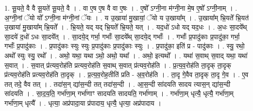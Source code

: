 \documentclass[17pt]{extarticle}
\begin{document}
1. सू॒यते॒ वै वै सू॒यते॑ सू॒यते॒ वै । . वा ए॒ष ए॒ष वै वा ए॒षः । . ए॒षो᳚ ऽग्नी॒ना म॑ग्नी॒ना मे॒ष ए॒षो᳚ ऽग्नी॒नाम् । . अ॒ग्नी॒नां ॅयो यो᳚ ऽग्नी॒ना म॑ग्नी॒नां ॅयः । . य उ॒खाया॑ मु॒खायां॒ ॅयो य उ॒खाया᳚म् । . उ॒खाया᳚म् भ्रि॒यते᳚ भ्रि॒यत॑ उ॒खाया॑ मु॒खाया᳚म् भ्रि॒यते᳚ । . भ्रि॒यते॒ यद् यद् भ्रि॒यते᳚ भ्रि॒यते॒ यत् । . यद॒धो॑ ऽधो यद् यद॒धः । . अ॒धः सा॒दये᳚थ् सा॒दये॑ द॒धो॑ ऽधः सा॒दये᳚त् । . सा॒दये॒द् गर्भा॒ गर्भाः᳚ सा॒दये᳚थ् सा॒दये॒द् गर्भाः᳚ । . गर्भाः᳚ प्र॒पादु॑काः प्र॒पादु॑का॒ गर्भा॒ गर्भाः᳚ प्र॒पादु॑काः । . प्र॒पादु॑काः स्युः स्युः प्र॒पादु॑काः प्र॒पादु॑काः स्युः । . प्र॒पादु॑का॒ इति॑ प्र - पादु॑काः । . स्यु॒ रथो॒ अथो᳚ स्युः स्यु॒ रथो᳚ । . अथो॒ यथा॒ यथा ऽथो॒ अथो॒ यथा᳚ । . अथो॒ इत्यथो᳚ । . यथा॑ स॒वाथ् स॒वाद् यथा॒ यथा॑ स॒वात् । . स॒वात् प्र॑त्यव॒रोह॑ति प्रत्यव॒रोह॑ति स॒वाथ् स॒वात् प्र॑त्यव॒रोह॑ति । . प्र॒त्य॒व॒रोह॑ति ता॒दृक् ता॒दृक् प्र॑त्यव॒रोह॑ति प्रत्यव॒रोह॑ति ता॒दृक् । . प्र॒त्य॒व॒रोह॒तीति॑ प्रति - अ॒व॒रोह॑ति । . ता॒दृ गे॒वैव ता॒दृक् ता॒दृ गे॒व । . ए॒व तत् तदे॒ वैव तत् । . तदा॑स॒न् द्या॑स॒न्दी तत् तदा॑स॒न्दी । . आ॒स॒न्दी सा॑दयति सादय त्यास॒न् द्या॑स॒न्दी सा॑दयति । . सा॒द॒य॒ति॒ गर्भा॑णा॒म् गर्भा॑णाꣳ सादयति सादयति॒ गर्भा॑णाम् । . गर्भा॑णा॒म् धृत्यै॒ धृत्यै॒ गर्भा॑णा॒म् गर्भा॑णा॒म् धृत्यै᳚ । . धृत्या॒ अप्र॑पादा॒या प्र॑पादाय॒ धृत्यै॒ धृत्या॒ अप्र॑पादाय । \newline
\end{document}
